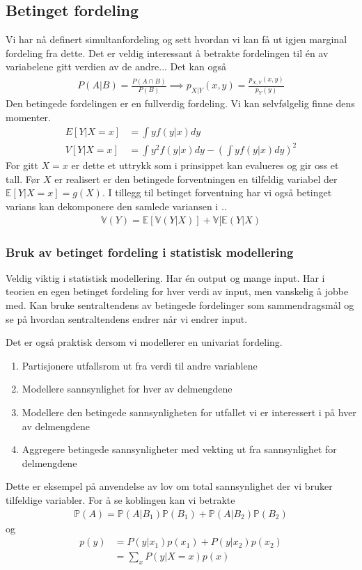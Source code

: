 \subsection{Betinget fordeling}
Vi har nå definert simultanfordeling og sett hvordan vi kan få ut igjen marginal fordeling fra dette. Det er veldig interessant å betrakte fordelingen til én av variabelene gitt verdien av de andre... 
Det kan også
\begin{align}
P(A|B)=\frac{P(A\cap B)}{P(B)} \implies p_{X|Y}(x,y) = \frac{p_{X,Y}(x,y)}{p_Y(y)}
\end{align}
Den betingede fordelingen er en fullverdig fordeling. Vi kan selvfølgelig finne dens momenter. 
\begin{align}
E[Y|X=x]&=\int y f(y|x)dy \\
V[Y|X=x]&=\int y^2f(y|x)dy-\left(\int y f(y|x)dy\right)^2
\end{align}
For gitt $X=x$ er dette et uttrykk som i prinsippet kan evalueres og gir oss et tall. Før $X$ er realisert er den betingede forventningen en tilfeldig variabel der $\mathbb{E}[Y|X=x]=g(X)$. I tillegg til betinget forventning har vi også betinget varians
kan dekomponere den samlede variansen i ..
\begin{align}
\mathbb{V}(Y) = \mathbb{E}[\mathbb{V}(Y|X)]+\mathbb{V}[\mathbb{E}(Y|X)
\end{align}
\subsubsection{Bruk av betinget fordeling i statistisk modellering}
Veldig viktig i statistisk modellering. Har én output og mange input. Har i teorien en egen betinget fordeling for hver verdi av input, men vanskelig å jobbe med. Kan bruke sentraltendens av betingede fordelinger som sammendragsmål og se på hvordan sentraltendens endrer når vi endrer input. 

Det er også praktisk dersom vi modellerer en univariat fordeling.
\begin{enumerate}
\item Partisjonere utfallsrom ut fra verdi til andre variablene
\item Modellere sannsynlighet for hver av delmengdene
\item Modellere den betingede sannsynligheten for utfallet vi er interessert i på hver av delmengdene
\item Aggregere betingede sannsynligheter med vekting ut fra sannsynlighet for delmengdene
\end{enumerate}
Dette er eksempel på anvendelse av lov om total sannsynlighet der vi bruker tilfeldige variabler. For å se koblingen kan vi betrakte
\begin{align}
\mathbb{P}(A)=\mathbb{P}(A|B_1)\mathbb{P}(B_1)+\mathbb{P}(A|B_2)\mathbb{P}(B_2)
\end{align}
og
\begin{align}
p(y) &= P(y|x_1)p(x_1) +  P(y|x_2)p(x_2) \\
&= \sum_x P(y|X=x)p(x)
\end{align}
